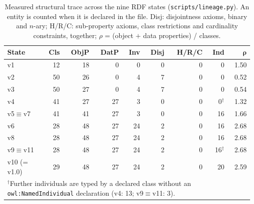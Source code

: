 \begin{table}[!t]
\caption{Measured structural trace across the nine RDF states (\texttt{scripts/lineage.py}). An entity is counted when it is declared in the file. Disj: disjointness axioms, binary and $n$-ary; H/R/C: sub-property axioms, class restrictions and cardinality constraints, together; $\rho$ = (object $+$ data properties) / classes.}
\label{tab:lineage}
\centering
\footnotesize
\setlength{\tabcolsep}{3.5pt}
\begin{tabular}{lrrrrrrrr}
\hline
\textbf{State} & \textbf{Cls} & \textbf{ObjP} & \textbf{DatP} & \textbf{Inv} & \textbf{Disj} & \textbf{H/R/C} & \textbf{Ind} & $\bm{\rho}$ \\
\hline
v1 & 12 & 18 & 0 & 0 & 0 & 0 & 0 & 1.50 \\
v2 & 50 & 26 & 0 & 4 & 7 & 0 & 0 & 0.52 \\
v3 & 50 & 27 & 0 & 4 & 7 & 0 & 0 & 0.54 \\
v4 & 41 & 27 & 27 & 3 & 0 & 0 & 0$^{\dagger}$ & 1.32 \\
v5$\equiv$v7 & 41 & 41 & 27 & 3 & 0 & 0 & 16 & 1.66 \\
v6 & 28 & 48 & 27 & 24 & 2 & 0 & 16 & 2.68 \\
v8 & 28 & 48 & 27 & 24 & 2 & 0 & 16 & 2.68 \\
v9$\equiv$v11 & 28 & 48 & 27 & 24 & 2 & 0 & 16$^{\dagger}$ & 2.68 \\
v10 (= v1.0) & 29 & 48 & 27 & 24 & 2 & 0 & 20 & 2.59 \\
\hline
\multicolumn{9}{p{7.6cm}}{\footnotesize $^{\dagger}$Further individuals are typed by a declared class without an \texttt{owl:NamedIndividual} declaration (v4: 13; v9$\equiv$v11: 3).} \\
\end{tabular}
\end{table}
